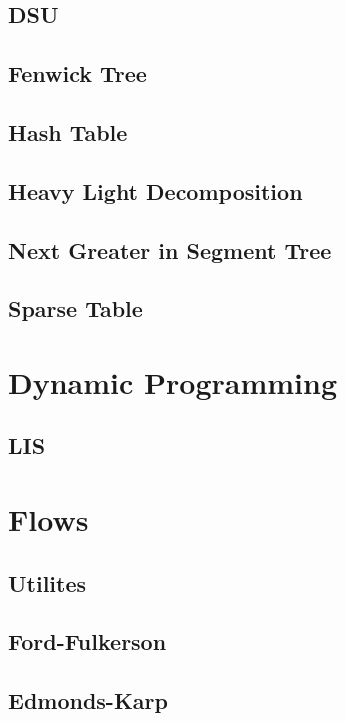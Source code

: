 \subsection{DSU}

\subsection{Fenwick Tree}

\subsection{Hash Table}

\subsection{Heavy Light Decomposition}

\subsection{Next Greater in Segment Tree}

\subsection{Sparse Table}



\section{Dynamic Programming}

\subsection{LIS}



\section{Flows}

\subsection{Utilites}

\subsection{Ford-Fulkerson}

\subsection{Edmonds-Karp}

